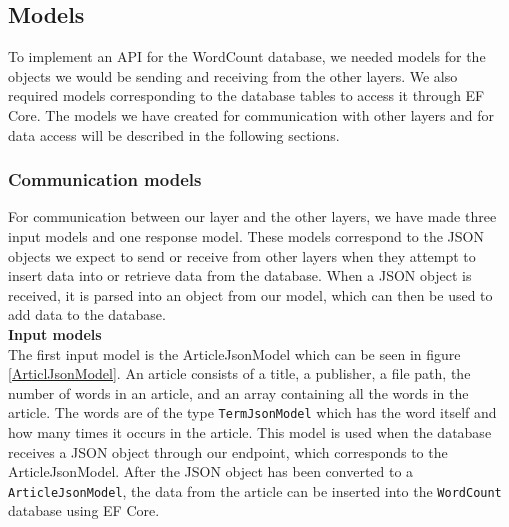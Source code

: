 \subsection{Models}
To implement an API for the WordCount database, we needed models for the objects we would be sending and receiving from the other layers. 
We also required models corresponding to the database tables to access it through EF Core. The models we have created for communication with other layers and for data access will be described in the following sections.

\subsubsection*{Communication models}
For communication between our layer and the other layers, we have made three input models and one response model. 
These models correspond to the JSON objects we expect to send or receive from other layers when they attempt to insert data into or retrieve data from the database. 
When a JSON object is received, it is parsed into an object from our model, which can then be used to add data to the database.
\\

\textbf{Input models}\\
The first input model is the ArticleJsonModel which can be seen in figure \ref{ArticlJsonModel}. An article consists of a title, a publisher, a file path, the number of words in an article, and an array containing all the words in the article. 
The words are of the type \texttt{TermJsonModel} which has the word itself and how many times it occurs in the article.
This model is used when the database receives a JSON object through our endpoint, which corresponds to the ArticleJsonModel. 
After the JSON object has been converted to a \texttt{ArticleJsonModel}, the data from the article can be inserted into the \texttt{WordCount} database using EF Core.

